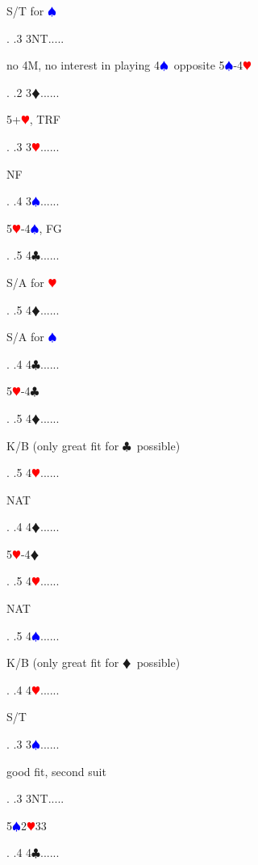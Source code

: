 \documentclass[a4paper]{article}
\newcommand{\BC}{\textcolor{OliveGreen}{$\clubsuit$}}
\newcommand{\BD}{\textcolor{RedOrange}{$\vardiamondsuit$}}
\newcommand{\BH}{\textcolor{Red}{$\varheartsuit${}}}
\newcommand{\BS}{\textcolor{Blue}{$\spadesuit${}}}
\begin{document}
{\begin{minipage}[t]{0.8\textwidth}
S/T for \BS 
\end{minipage}. 
 .3 3NT.....\begin{minipage}[t]{0.8\textwidth}
no 4M, no interest in playing 4\BS\ opposite 5\BS -4\BH 
\end{minipage}. 
 .2 3\BD......\begin{minipage}[t]{0.8\textwidth}
5+\BH , TRF
\end{minipage}. 
 .3 3\BH......\begin{minipage}[t]{0.8\textwidth}
NF
\end{minipage}. 
 .4 3\BS......\begin{minipage}[t]{0.8\textwidth}
5\BH -4\BS , FG
\end{minipage}. 
 .5 4\BC......\begin{minipage}[t]{0.8\textwidth}
S/A for \BH 
\end{minipage}. 
 .5 4\BD......\begin{minipage}[t]{0.8\textwidth}
S/A for \BS 
\end{minipage}. 
 .4 4\BC......\begin{minipage}[t]{0.8\textwidth}
5\BH -4\BC 
\end{minipage}. 
 .5 4\BD......\begin{minipage}[t]{0.8\textwidth}
K/B (only great fit for \BC\ possible)
\end{minipage}. 
 .5 4\BH......\begin{minipage}[t]{0.8\textwidth}
NAT
\end{minipage}. 
 .4 4\BD......\begin{minipage}[t]{0.8\textwidth}
5\BH -4\BD 
\end{minipage}. 
 .5 4\BH......\begin{minipage}[t]{0.8\textwidth}
NAT
\end{minipage}. 
 .5 4\BS......\begin{minipage}[t]{0.8\textwidth}
K/B (only great fit for \BD\ possible)
\end{minipage}. 
 .4 4\BH......\begin{minipage}[t]{0.8\textwidth}
S/T
\end{minipage}. 
 .3 3\BS......\begin{minipage}[t]{0.8\textwidth}
good fit, second suit
\end{minipage}. 
 .3 3NT.....\begin{minipage}[t]{0.8\textwidth}
5\BS 2\BH 33
\end{minipage}. 
 .4 4\BC......\begin{minipage}[t]{0.8\textwidth}

\end{minipage}}
\end{document}

